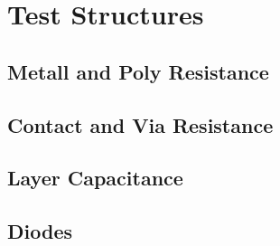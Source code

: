 \section{Test Structures}

\subsection{Metall and Poly Resistance}


\subsection{Contact and Via Resistance}

\subsection{Layer Capacitance}

\subsection{Diodes}

